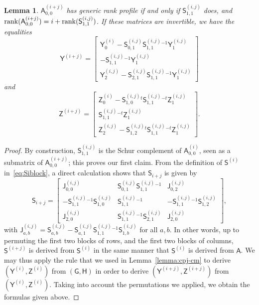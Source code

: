 \documentclass{sig-alternate}
\newcommand{\mA}{\ensuremath{\mathsf{A}}}
\newcommand{\mG}{\ensuremath{\mathsf{G}}}
\newcommand{\mH}{\ensuremath{\mathsf{H}}}
\newcommand{\mJ}{\ensuremath{\mathsf{J}}}
\newcommand{\mS}{\ensuremath{\mathsf{S}}}
\newcommand{\mY}{\ensuremath{\mathsf{Y}}}
\newcommand{\mZ}{\ensuremath{\mathsf{Z}}}
\newtheorem{lemma}[definition]{Lemma}
\begin{document}
\begin{lemma}\label{lemma:update}
  $\mA^{(i+j)}_{0,0}$ has generic rank profile if and only if
  $\mS^{(i,j)}_{1,1}$ does, and ${\rm rank}(\mA^{(i+j)}_{0,0})=i+{\rm
    rank}(\mS^{(i,j)}_{1,1})$.  If these matrices are invertible, we
  have the equalities
$$\mY^{(i+j)} =\left [ \begin{matrix}
\mY^{(i)}_0 -  \mS^{(i,j)}_{0,1} \mS^{(i,j)}_{1,1}{}^{-1} \mY^{(i,j)}_1\\[1mm]
- \mS^{(i,j)}_{1,1}{}^{-1} \mY^{(i,j)}_1\\[1mm]
\mY^{(i,j)}_2 - \mS^{(i,j)}_{2,1} \mS^{(i,j)}_{1,1}{}^{-1} \mY^{(i,j)}_1
  \end{matrix}\right ]$$
and
$$
\mZ^{(i+j)} =\left [ \begin{matrix} 
\mZ^{(i)}_0 - \mS^{(i,j)}_{1,0}{}^t \mS^{(i,j)}_{1,1}{}^{-t} \mZ^{(i,j)}_1\\[1mm]
 \mS^{(i,j)}_{1,1}{}^{-t} \mZ^{(i,j)}_1\\[1mm]
\mZ^{(i,j)}_2 - \mS^{(i,j)}_{1,2}{}^t \mS^{(i,j)}_{1,1}{}^{-t} \mZ^{(i,j)}_1
  \end{matrix}\right ].$$
\end{lemma}
\begin{proof}
  By construction, $\mS^{(i,j)}_{1,1}$ is the Schur complement of ${\mA^{(i)}_{0,0}}$,
  seen as a submatrix of $\mA^{(i+j)}_{0,0}$; this proves our first claim. From the definition of
  $\mS^{(i)}$ in~\eqref{eq:Siblock}, a direct calculation shows that $\mS_{i+j}$
  is given by
$$\mS_{i+j} = \left [ \begin{matrix} 
\mJ^{(i,j)}_{0,0} &
         \mS^{(i,j)}_{0,1}\mS^{(i,j)}_{1,1}{}^{-1} &
         \mJ^{(i,j)}_{0,2} \\
-\mS^{(i,j)}_{1,1}{}^{-1}\mS^{(i,j)}_{1,0} & 
         \mS^{(i,j)}_{1,1}{}^{-1} &
        -\mS^{(i,j)}_{1,1}{}^{-1} \mS^{(i,j)}_{1,2}\\ 
\mJ^{(i,j)}_{2,0} &
         \mS^{(i,j)}_{1,1}{}^{-1}\mS^{(i,j)}_{2,1} & 
\mJ^{(i,j)}_{2,0} 
    \end{matrix}\right ],$$
with $\mJ^{(i,j)}_{a,b}=\mS^{(i,j)}_{a,b} -\mS^{(i,j)}_{a,1} \mS^{(i,j)}_{1,1}{}^{-1}\mS^{(i,j)}_{1,b}$
for all $a,b$.
In other words, up to permuting the first two blocks of rows, and the
first two blocks of columns, $\mS^{(i+j)}$ is derived from $\mS^{(i)}$ in
the same manner that $\mS^{(i)}$ is derived from $\mA$. We may thus apply
the rule that we used in Lemma~\ref{lemma:cpj-cm} to derive
$(\mY^{(i)},\mZ^{(i)})$ from $(\mG,\mH)$ in order to derive
$(\mY^{(i+j)},\mZ^{(i+j)})$ from $(\mY^{(i)},\mZ^{(i)})$.  Taking into account the
permutations we applied, we obtain the formulas given above.
\end{proof}
\end{document}
